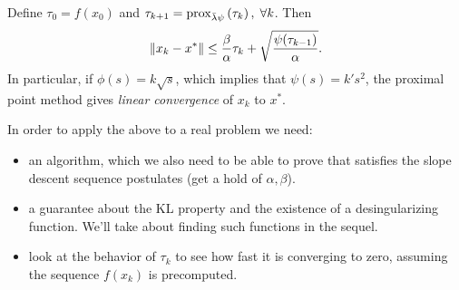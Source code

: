 Define $\tau_0 = f(x_0)$ and $\tau_{k+1} = \mathrm{prox}_{\bar{\lambda} \psi}\left( \tau_k \right),
\; \forall k$. Then
\[
	\left \| x_k - x^* \right \| \leq \frac{\beta}{\alpha} \tau_k +
	\sqrt{\frac{\psi(\tau_{k-1})}{\alpha}}.
\]
In particular, if $\phi(s) = k \sqrt{s}$, which implies that $\psi(s) = k'
s^2$, the proximal point method gives \textit{linear convergence} of $x_k$ to
$x^*$.

In order to apply the above to a real problem we need:
\begin{itemize}
	\item an algorithm, which we also need to be able to prove that satisfies
	the slope descent sequence postulates (get a hold of $\alpha, \beta$).
	\item a guarantee about the KL property and the existence of a
	desingularizing function. We'll take about finding such functions in the
	sequel.
	\item look at the behavior of $\tau_k$ to see how fast it is converging to
	zero, assuming the sequence $f(x_k)$ is precomputed.
\end{itemize}
